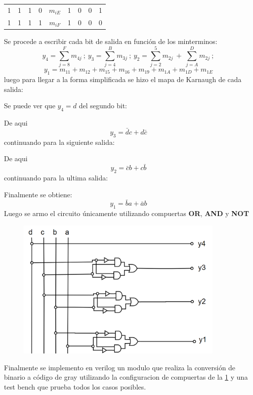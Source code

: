 \documentclass[a4paper]{article}
\begin{document}
\begin{table}[H]
\begin{tabular}{|c|c|c|c|c|c|c|c|c|}
1                                  & 1                                 & 1                                 & 0            & \textbf{$m_{iE}$} & 1                                   & 0                                   & 0                                   & 1                                   \\ \cline{5-5}
1                                  & 1                                 & 1                                 & 1            & \textbf{$m_{iF}$} & 1                                   & 0                                   & 0                                   & 0                                   \\ \cline{5-5}
\hline
\end{tabular}
\end{table}

Se procede a escribir cada bit de salida en función de los minterminos:
\[
	y_4 = \sum_{j=8}^{F} m_{4j}  \  ; \ y_3 = \sum_{j=4}^{B} m_{3j}\  ; \ y_2 = \sum_{j=2}^{5} m_{2j} \ + \  \sum_{j=A}^{D} m_{2j}  \  ;\]
\[
	y_1=m_{11}+m_{12}+m_{15}+m_{16}+m_{19}+m_{1A}+m_{1D}+m_{1E} 
\]
luego para llegar a la forma simplificada se hizo el mapa de Karnaugh de cada salida:



Se puede ver que $y_4 = d$ del segundo bit:



De aqui $$y_3 = \bar{d}c+d\bar{c}$$
continuando para la siguiente salida:



De aqui $$y_2 = \bar{c}b+c\bar{b}$$
continuando para la ultima salida:



Finalmente se obtiene: $$y_1 = \bar{b}a+\bar{a}b$$
Luego se armo el circuito únicamente utilizando compuertas \textbf{OR}, \textbf{AND} y \textbf{NOT}

\begin{figure}[H]
	\centering
	\includegraphics[width=0.9\textwidth]{Circuito3.PNG}
	\label{fig:circ3}
\end{figure}
Finalmente se implemento en verilog un modulo que realiza la conversión de binario a código de gray utilizando la configuracion de compuertas de la \ref{fig:circ3}
y una test bench que prueba todos los casos posibles.
\end{document}
